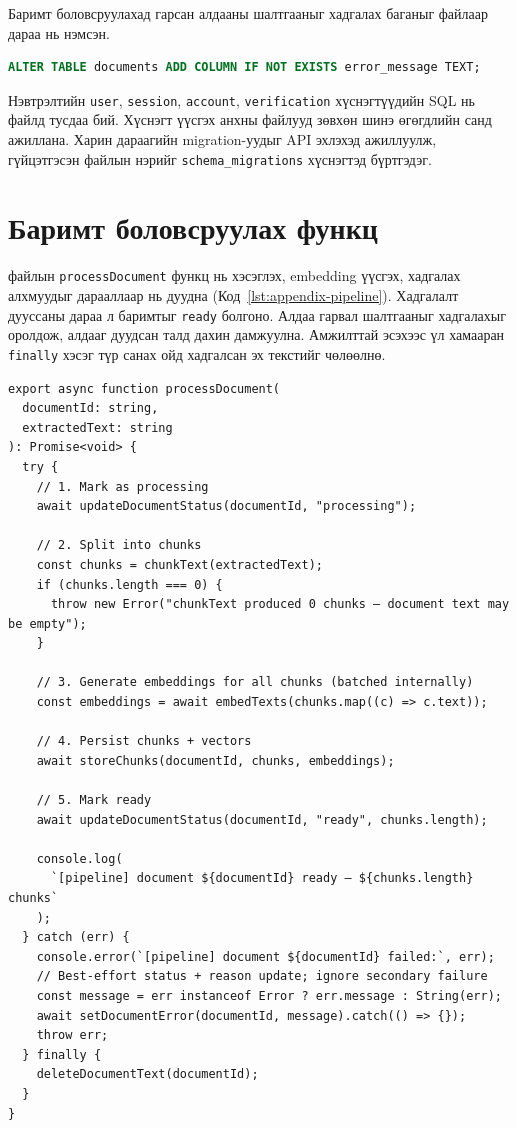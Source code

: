 \documentclass[../main.tex]{subfiles}
\begin{document}
Баримт боловсруулахад гарсан алдааны шалтгааныг хадгалах баганыг
файлаар дараа нь нэмсэн.

\begin{lstlisting}[language=SQL, caption={Алдааны тайлбар хадгалах баганын migration}, label={lst:appendix-migration}]
ALTER TABLE documents ADD COLUMN IF NOT EXISTS error_message TEXT;
\end{lstlisting}

Нэвтрэлтийн \texttt{user}, \texttt{session}, \texttt{account},
\texttt{verification} хүснэгтүүдийн SQL нь
 файлд тусдаа бий. Хүснэгт үүсгэх
анхны файлууд зөвхөн шинэ өгөгдлийн санд ажиллана. Харин дараагийн
migration-уудыг API эхлэхэд ажиллуулж, гүйцэтгэсэн файлын нэрийг
\texttt{schema\_migrations} хүснэгтэд бүртгэдэг.

\section{Баримт боловсруулах функц}
\label{sec:appendix-pipeline}

 файлын
\texttt{processDocument} функц нь хэсэглэх, embedding үүсгэх, хадгалах
алхмуудыг дарааллаар нь дуудна (Код~\ref{lst:appendix-pipeline}).
Хадгалалт дууссаны дараа л баримтыг \texttt{ready} болгоно.
Алдаа гарвал шалтгааныг хадгалахыг оролдож, алдааг дуудсан талд дахин
дамжуулна. Амжилттай эсэхээс үл хамааран \texttt{finally} хэсэг түр
санах ойд хадгалсан эх текстийг чөлөөлнө.

\begin{lstlisting}[caption={Баримт боловсруулах үндсэн дараалал}, label={lst:appendix-pipeline}]
export async function processDocument(
  documentId: string,
  extractedText: string
): Promise<void> {
  try {
    // 1. Mark as processing
    await updateDocumentStatus(documentId, "processing");

    // 2. Split into chunks
    const chunks = chunkText(extractedText);
    if (chunks.length === 0) {
      throw new Error("chunkText produced 0 chunks — document text may be empty");
    }

    // 3. Generate embeddings for all chunks (batched internally)
    const embeddings = await embedTexts(chunks.map((c) => c.text));

    // 4. Persist chunks + vectors
    await storeChunks(documentId, chunks, embeddings);

    // 5. Mark ready
    await updateDocumentStatus(documentId, "ready", chunks.length);

    console.log(
      `[pipeline] document ${documentId} ready — ${chunks.length} chunks`
    );
  } catch (err) {
    console.error(`[pipeline] document ${documentId} failed:`, err);
    // Best-effort status + reason update; ignore secondary failure
    const message = err instanceof Error ? err.message : String(err);
    await setDocumentError(documentId, message).catch(() => {});
    throw err;
  } finally {
    deleteDocumentText(documentId);
  }
}
\end{lstlisting}
\end{document}

